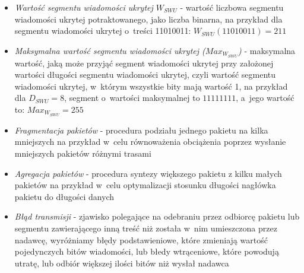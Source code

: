 \documentclass[a4paper, twoside, 12pt]{report}
\begin{document}
\begin{itemize}
        \item \emph{Wartość segmentu wiadomości ukrytej \( W_{SWU} \)} - wartość
            liczbowa segmentu wiadomości ukrytej potraktowanego, jako liczba binarna,
            na przykład dla segmentu wiadomości ukrytej o~treści 11010011:
            \( W_{SWU}(11010011) = 211 \)

       \item \emph{Maksymalna wartość segmentu wiadomości ukrytej (\( Max_{W_{SWU}} \))} -
           maksymalna wartość, jaką może przyjąć segment wiadomości ukrytej przy
           założonej wartości długości segmentu wiadomości ukrytej, czyli wartość
           segmentu wiadomości ukrytej, w~którym wszystkie bity mają wartość 1,
           na przykład dla \( D_{SWU} = 8 \), segment o~wartości maksymalnej to
           \( 11111111 \), a~jego wartość to: \( Max_{W_{SWU}} = 255 \)

       \item \emph{Fragmentacja pakietów} - procedura podziału jednego pakietu na
           kilka mniejszych na przykład w~celu równoważenia obciążenia poprzez
           wysłanie mniejszych pakietów różnymi trasami

       \item \emph{Agregacja pakietów} - procedura syntezy większego pakietu z
           kilku małych pakietów na przykład w~celu optymalizacji stosunku długości
           nagłówka pakietu do długości danych

       \item \emph{Błąd transmisji} - zjawisko polegające na odebraniu przez odbiorcę
           pakietu lub segmentu zawierającego inną treść niż została w~nim
           umieszczona przez nadawcę, wyróżniamy błędy podstawieniowe, które
           zmieniają wartość pojedynczych bitów wiadomości, lub błedy wtrąceniowe,
           które powodują utratę, lub odbiór większej ilości bitów niż wysłał nadawca

    \end{itemize}
\end{document}
